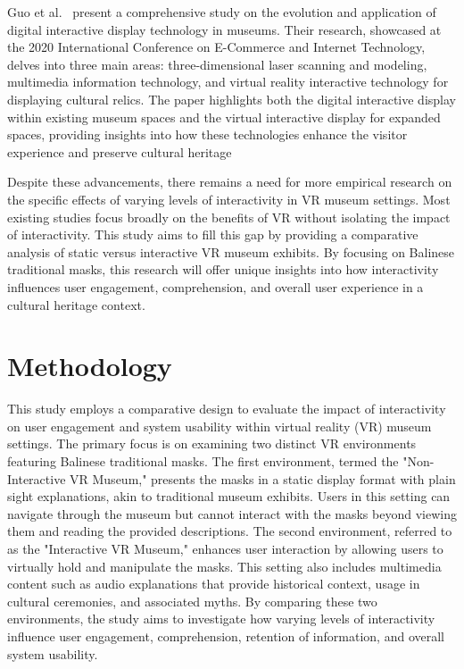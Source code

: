 \documentclass[conference]{IEEEtran}
\begin{document}
Guo et al.~\cite{9134304} present a comprehensive study on the evolution and application of digital interactive display technology in museums. Their research, showcased at the 2020 International Conference on E-Commerce and Internet Technology, delves into three main areas: three-dimensional laser scanning and modeling, multimedia information technology, and virtual reality interactive technology for displaying cultural relics. The paper highlights both the digital interactive display within existing museum spaces and the virtual interactive display for expanded spaces, providing insights into how these technologies enhance the visitor experience and preserve cultural heritage

Despite these advancements, there remains a need for more empirical research on the specific effects of varying levels of interactivity in VR museum settings. Most existing studies focus broadly on the benefits of VR without isolating the impact of interactivity. This study aims to fill this gap by providing a comparative analysis of static versus interactive VR museum exhibits. By focusing on Balinese traditional masks, this research will offer unique insights into how interactivity influences user engagement, comprehension, and overall user experience in a cultural heritage context.

\section{Methodology}

This study employs a comparative design to evaluate the impact of interactivity on user engagement and system usability within virtual reality (VR) museum settings. The primary focus is on examining two distinct VR environments featuring Balinese traditional masks. The first environment, termed the "Non-Interactive VR Museum," presents the masks in a static display format with plain sight explanations, akin to traditional museum exhibits. Users in this setting can navigate through the museum but cannot interact with the masks beyond viewing them and reading the provided descriptions. The second environment, referred to as the "Interactive VR Museum," enhances user interaction by allowing users to virtually hold and manipulate the masks. This setting also includes multimedia content such as audio explanations that provide historical context, usage in cultural ceremonies, and associated myths. By comparing these two environments, the study aims to investigate how varying levels of interactivity influence user engagement, comprehension, retention of information, and overall system usability.
\end{document}
